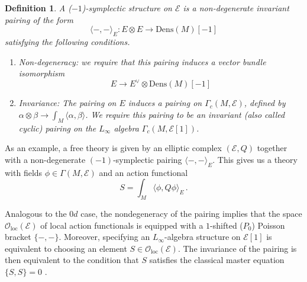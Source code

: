 \documentclass[11pt]{article}
\numberwithin{equation}{section}
\newtheorem{definition}{Definition}[section]
\begin{document}
\begin{definition}
A ($-1$)-symplectic structure on $\mathcal{E}$ is a non-degenerate invariant pairing of the form
	\begin{equation*}
		\langle-,-\rangle_E: E\otimes E \to \mathrm{Dens}(M)[-1]
	\end{equation*}
	satisfying the following conditions.
	\begin{enumerate}
		\item Non-degeneracy: we require that this pairing induces a vector bundle isomorphism
		\begin{equation}
			E \to E^{\vee}\otimes\mathrm{Dens}(M)[-1]
		\end{equation}
		\item Invariance: The pairing on $E$ induces a pairing on $\Gamma_c(M,\mathcal{E})$, defined by $\alpha\otimes\beta \to \int_M\langle\alpha,\beta\rangle$. We require this pairing to be an invariant (also called cyclic) pairing on the $L_\infty$ algebra $\Gamma_c(M,\mathcal{E}[1])$.
	\end{enumerate}
\end{definition}
As an example, a free theory is given by an elliptic complex $(\mathcal{E},Q)$ together with a non-degenerate $(-1)$-symplectic pairing $\langle-,-\rangle_E$. This gives us a theory with fields $\phi \in \Gamma(M,\mathcal{E})$ and an action functional
\begin{equation}
	S = \int_M \langle \phi, Q\phi \rangle_E\,.
\end{equation}

Analogous to the $0d$ case, the nondegeneracy of the pairing implies that the space $\mathcal{O}_{\mathrm{loc}}(\mathcal{E})$ of local action functionals is equipped with a $1$-shifted ($P_0$) Poisson bracket $\{-,-\}$. Moreover, specifying an $L_\infty$-algebra structure on $\mathcal{E}[1]$ is equivalent to choosing an element $S\in \mathcal{O}_{\mathrm{loc}}(\mathcal{E})$. The invariance of the pairing is then equivalent to the condition that $S$ satisfies the classical master equation $\{S,S\}=0$ \cite{costello2021factorization}.
\end{document}
